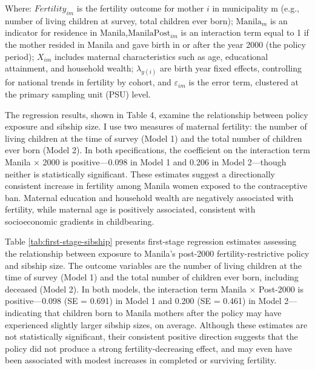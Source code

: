 \documentclass[]{AEA}
\begin{document}
Where: \(Fertility_{im}\) is the fertility outcome for mother \(i\) in
municipality m (e.g., number of living children at survey, total
children ever born); \(\text{Manila}_m\) is an indicator for residence
in Manila,\(\text{ManilaPost}_{im}\) is an interaction term equal to 1
if the mother resided in Manila and gave birth in or after the year 2000
(the policy period); \(X_{im}\) includes maternal characteristics such
as age, educational attainment, and household wealth; \(\lambda_{y(i)}\)
are birth year fixed effects, controlling for national trends in
fertility by cohort, and \(\varepsilon_{im}\) is the error term,
clustered at the primary sampling unit (PSU) level.

The regression results, shown in Table 4, examine the relationship
between policy exposure and sibship size. I use two measures of maternal
fertility: the number of living children at the time of survey (Model 1)
and the total number of children ever born (Model 2). In both
specifications, the coefficient on the interaction term Manila × 2000 is
positive---0.098 in Model 1 and 0.206 in Model 2---though neither is
statistically significant. These estimates suggest a directionally
consistent increase in fertility among Manila women exposed to the
contraceptive ban. Maternal education and household wealth are
negatively associated with fertility, while maternal age is positively
associated, consistent with socioeconomic gradients in childbearing.

Table \ref{tab:first-stage-sibship} presents first-stage regression
estimates assessing the relationship between exposure to Manila's
post-2000 fertility-restrictive policy and sibship size. The outcome
variables are the number of living children at the time of survey (Model
1) and the total number of children ever born, including deceased (Model
2). In both models, the interaction term Manila × Post-2000 is
positive---0.098 (SE = 0.691) in Model 1 and 0.200 (SE = 0.461) in Model
2---indicating that children born to Manila mothers after the policy may
have experienced slightly larger sibship sizes, on average. Although
these estimates are not statistically significant, their consistent
positive direction suggests that the policy did not produce a strong
fertility-decreasing effect, and may even have been associated with
modest increases in completed or surviving fertility.
\end{document}
